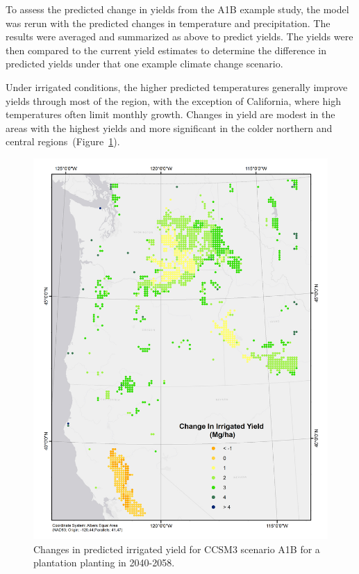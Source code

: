 \documentclass[preprint,review,12pt]{elsarticle}
\begin{document}
To assess the predicted change in yields from the A1B example study,
the model was rerun
with the predicted changes in temperature and precipitation.  The
results were averaged and summarized as above to predict yields.  The
yields were then compared to the current yield estimates to determine
the difference in predicted yields under that one example climate
change scenario.

Under irrigated conditions, the higher predicted temperatures
generally improve yields through most of the region, with the
exception of California, where high temperatures often limit monthly
growth.  Changes in yield are modest in the areas with the highest
yields and more significant in the colder northern and central
regions~(Figure~\ref{fig:new_irrigated}).
 
\begin{figure}[hp]
  \centering
  \includegraphics[width=1\linewidth]{climate_irrigated}
  \caption{Changes in predicted irrigated yield for \ac{CCSM3} scenario A1B
    for a plantation planting in 2040-2058.}
  \label{fig:new_irrigated}
\end{figure}
\end{document}

